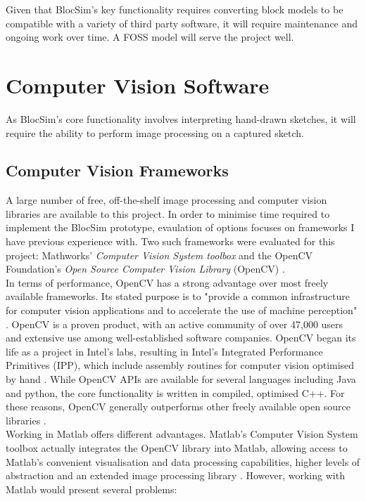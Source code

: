Given that BlocSim's key functionality requires converting block models to be compatible with a variety of third party software, it will require maintenance and ongoing work over time. A FOSS model will serve the project well.



\section{Computer Vision Software}

As BlocSim's core functionality involves interpreting hand-drawn sketches, it will require the ability to perform image processing on a captured sketch.

\subsection{Computer Vision Frameworks}

A large number of free, off-the-shelf image processing and computer vision libraries are available to this project. In order to minimise time required to implement the BlocSim prototype, evaulation of options focuses on frameworks I have previous experience with. Two such frameworks were evaluated for this project: Mathworks' \textit{Computer Vision System toolbox} \cite{matlab} and the OpenCV Foundation's \textit{Open Source Computer Vision Library} (OpenCV) \cite{opencv}.
\\

In terms of performance, OpenCV has a strong advantage over most freely available frameworks.
Its stated purpose is to "provide a common infrastructure for computer vision applications and to accelerate the use of machine perception" \cite{opencv}. OpenCV is a proven product, with an active community of over 47,000 users and extensive use among well-established software companies. OpenCV began its life as a project in Intel's labs, resulting in Intel's Integrated Performance Primitives (IPP), which include assembly routines for computer vision optimised by hand \cite{opencvBook}. While OpenCV APIs are available for several languages including Java and python, the core functionality is written in compiled, optimised C++. For these reasons, OpenCV generally outperforms other freely available open source libraries \cite{opencvBench}.
\\

Working in Matlab offers different advantages. Matlab's Computer Vision System toolbox actually integrates the OpenCV library into Matlab, allowing access to Matlab's convenient visualisation and data processing capabilities, higher levels of abstraction and an extended image processing library \cite{matlabCV}. However, working with Matlab would present several problems:

